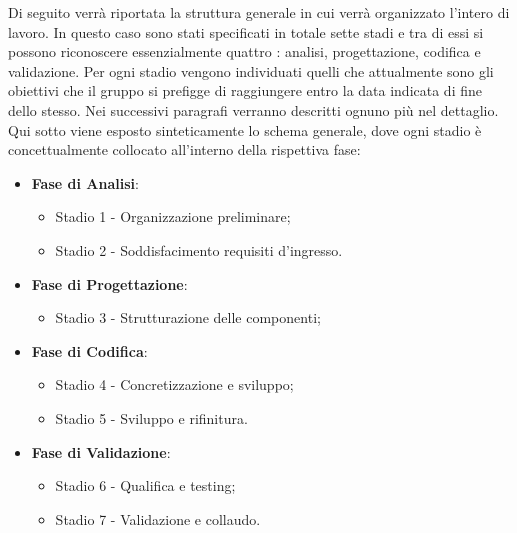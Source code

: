 Di seguito verrà riportata la struttura generale in cui verrà organizzato l'intero  di lavoro. In questo caso sono stati specificati in totale sette stadi e tra di essi si possono riconoscere essenzialmente quattro : analisi, progettazione, codifica e validazione. Per ogni stadio vengono individuati quelli che attualmente sono gli obiettivi che il gruppo \Gruppo{} si prefigge di raggiungere entro la data indicata di fine dello stesso. Nei successivi paragrafi verranno descritti ognuno più nel dettaglio.\\
Qui sotto viene esposto sinteticamente lo schema generale, dove ogni stadio è concettualmente collocato all'interno della rispettiva fase:

\begin{itemize}
    \item \textbf{Fase di Analisi}:
    \begin{itemize}
        \item Stadio 1 - Organizzazione preliminare;
        \item Stadio 2 - Soddisfacimento requisiti d'ingresso.
    \end{itemize}

    \item \textbf{Fase di Progettazione}:
    \begin{itemize}
        \item Stadio 3 - Strutturazione delle componenti;
    \end{itemize}

    \item \textbf{Fase di Codifica}:
    \begin{itemize}
        \item Stadio 4 - Concretizzazione e sviluppo;
        \item Stadio 5 - Sviluppo e rifinitura.
    \end{itemize}

    \item \textbf{Fase di Validazione}:
    \begin{itemize}
        \item Stadio 6 - Qualifica e testing;
        \item Stadio 7 - Validazione e collaudo.
    \end{itemize}
\end{itemize}

